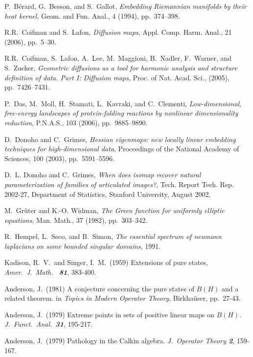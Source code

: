 \documentclass{pnastwo}
\begin{document}
\begin{article}
\begin{thebibliography}{10}
P.~B\'erard, G.~Besson, and S.~Gallot, {\em Embedding {R}iemannian
  manifolds by their heat kernel}, Geom. and Fun. Anal., 4 (1994),
  pp.~374--398.

R.R.~Coifman and S.~Lafon, {\em Diffusion maps}, Appl. Comp. Harm. Anal.,
  21 (2006), pp.~5--30.

R.R.~Coifman, S.~Lafon, A.~Lee, M.~Maggioni, B.~Nadler, F.~Warner, and
  S.~Zucker, {\em Geometric diffusions as a tool for harmonic analysis and
  structure definition of data. {P}art {I}: Diffusion maps}, Proc. of Nat.
  Acad. Sci.,  (2005), pp.~7426--7431.

P.~Das, M.~Moll, H.~Stamati, L.~Kavraki, and C.~Clementi, {\em
  Low-dimensional, free-energy landscapes of protein-folding reactions by
  nonlinear dimensionality reduction}, P.N.A.S., 103 (2006), pp.~9885--9890.

D.~Donoho and C.~Grimes, {\em Hessian eigenmaps: new locally linear
  embedding techniques for high-dimensional data}, Proceedings of the National
  Academy of Sciences, 100 (2003), pp.~5591--5596.

D.~L. Donoho and C.~Grimes, {\em When does isomap recover natural
  parameterization of families of articulated images?}, Tech. Report Tech. Rep.
  2002-27, Department of Statistics, Stanford University, August 2002.

M.~Gr\"uter and K.-O. Widman, {\em The {G}reen function for uniformly
  elliptic equations}, Man. Math., 37 (1982), pp.~303--342.

R.~Hempel, L.~Seco, and B.~Simon, {\em The essential spectrum of neumann
  laplacians on some bounded singular domains}, 1991.

Kadison, R.\ V.\ and Singer, I.\ M.\ (1959)
Extensions of pure states, {\it Amer.\ J.\ Math.\ \bf
81}, 383-400.

Anderson, J.\ (1981) A conjecture concerning the pure states of
$B(H)$ and a related theorem. in {\it Topics in Modern Operator
Theory}, Birkha\"user, pp.\ 27-43.

Anderson, J.\ (1979) Extreme points in sets of
positive linear maps on $B(H)$. {\it J.\ Funct.\
Anal.\
\bf 31}, 195-217.

Anderson, J.\ (1979) Pathology in the Calkin algebra. {\it J.\
Operator Theory \bf 2}, 159-167.


\end{thebibliography}
\end{article}
\end{document}
